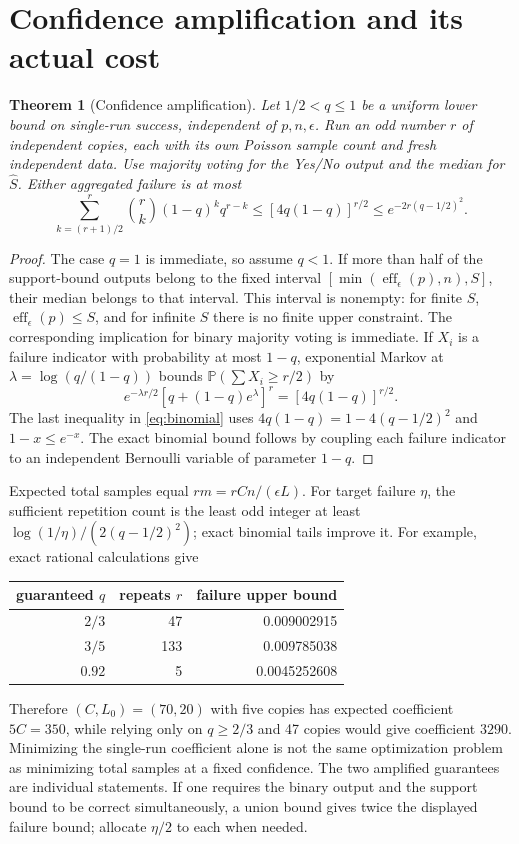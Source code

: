 \documentclass[10pt]{article}
\newtheorem{theorem}{Theorem}
\newcommand{\Prb}{\mathbb P}
\newcommand{\eff}{\operatorname{eff}}
\begin{document}
\section{Confidence amplification and its actual cost}
\begin{theorem}[Confidence amplification]\label{thm:amplification}
Let $1/2<q\le1$ be a uniform lower bound on single-run success, independent of
$p,n,\epsilon$. Run an odd number $r$ of independent copies, each with its
own Poisson sample count and fresh independent data.
Use majority voting for the Yes/No output and the median for
$\widehat S$. Either aggregated failure is at most
\begin{equation}\label{eq:binomial}
 \sum_{k=(r+1)/2}^r {r\choose k}(1-q)^kq^{r-k}
 \le [4q(1-q)]^{r/2}
 \le e^{-2r(q-1/2)^2}.
\end{equation}
\end{theorem}
\begin{proof}
The case $q=1$ is immediate, so assume $q<1$.
If more than half of the support-bound outputs belong to the fixed interval
$[\min(\eff_\epsilon(p),n),S]$, their median belongs to that interval.
This interval is nonempty: for finite $S$, $\eff_\epsilon(p)\le S$,
and for infinite $S$ there is no finite upper constraint.
The corresponding implication for binary majority voting is immediate.
If $X_i$ is a failure indicator with probability at most
$1-q$, exponential Markov at $\lambda=\log(q/(1-q))$ bounds
$\Prb(\sum X_i\ge r/2)$ by
\[
 e^{-\lambda r/2}[q+(1-q)e^\lambda]^r=[4q(1-q)]^{r/2}.
\]
The last inequality in \eqref{eq:binomial} uses
$4q(1-q)=1-4(q-1/2)^2$ and $1-x\le e^{-x}$.
The exact binomial bound follows by coupling each failure indicator to an
independent Bernoulli variable of parameter $1-q$.
\end{proof}

Expected total samples equal $rm=rCn/(\epsilon L)$.
For target failure $\eta$, the sufficient repetition count is the least odd
integer at least $\log(1/\eta)/(2(q-1/2)^2)$; exact binomial tails improve it.
For example, exact rational calculations give
\begin{center}
\begin{tabular}{rrr}
\toprule
guaranteed $q$ & repeats $r$ & failure upper bound\\
\midrule
$2/3$&47&0.009002915\\
$3/5$&133&0.009785038\\
$0.92$&5&0.0045252608\\
\bottomrule
\end{tabular}
\end{center}
Therefore $(C,L_0)=(70,20)$ with five copies has expected coefficient
$5C=350$, while relying only on $q\ge2/3$ and 47 copies would give
coefficient $3290$. Minimizing the single-run coefficient alone is not the
same optimization problem as minimizing total samples at a fixed confidence.
The two amplified guarantees are individual statements. If one requires
the binary output and the support bound to be correct simultaneously, a
union bound gives twice the displayed failure bound; allocate $\eta/2$ to
each when needed.
\end{document}
